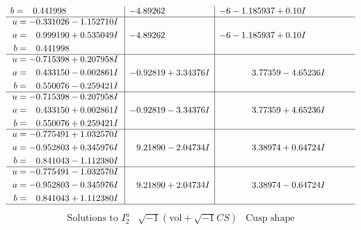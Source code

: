 \documentclass[1p]{elsarticle_modified}
\theoremstyle{definition}
\newcommand{\I}{\sqrt{-1}}
\begin{document}
$$\begin{array}{c|c|c}
\begin{aligned}
b &= \phantom{-}0.441998\phantom{ +0.000000I}\end{aligned}
 & -4.89262\phantom{ +0.000000I} &                  -6
-1.185937 + 0. 10   I\phantom{ +0.000000I} \\ \hline\begin{aligned}
u &= -0.331026 - 1.152710 I \\
a &= \phantom{-}0.999190 + 0.535049 I \\
b &= \phantom{-}0.441998\phantom{ +0.000000I}\end{aligned}
 & -4.89262\phantom{ +0.000000I} &                  -6
-1.185937 + 0. 10   I\phantom{ +0.000000I} \\ \hline\begin{aligned}
u &= -0.715398 + 0.207958 I \\
a &= \phantom{-}0.433150 - 0.002861 I \\
b &= \phantom{-}0.550076 - 0.259421 I\end{aligned}
 & -0.92819 + 3.34376 I & \phantom{-}3.77359 - 4.65236 I \\ \hline\begin{aligned}
u &= -0.715398 - 0.207958 I \\
a &= \phantom{-}0.433150 + 0.002861 I \\
b &= \phantom{-}0.550076 + 0.259421 I\end{aligned}
 & -0.92819 - 3.34376 I & \phantom{-}3.77359 + 4.65236 I \\ \hline\begin{aligned}
u &= -0.775491 + 1.032570 I \\
a &= -0.952803 + 0.345976 I \\
b &= \phantom{-}0.841043 - 1.112380 I\end{aligned}
 & \phantom{-}9.21890 - 2.04734 I & \phantom{-}3.38974 + 0.64724 I \\ \hline\begin{aligned}
u &= -0.775491 - 1.032570 I \\
a &= -0.952803 - 0.345976 I \\
b &= \phantom{-}0.841043 + 1.112380 I\end{aligned}
 & \phantom{-}9.21890 + 2.04734 I & \phantom{-}3.38974 - 0.64724 I\\
 \hline 
 \end{array}$$\newpage$$\begin{array}{c|c|c}  
\text{Solutions to }I^u_{2}& \I (\text{vol} + \sqrt{-1}CS) & \text{Cusp shape}\\
 \hline 
\begin{aligned}

\end{aligned}
\end{array}$$
\end{document}
